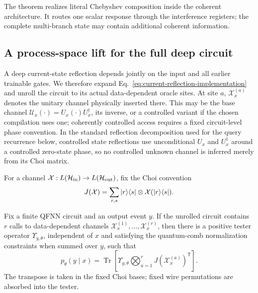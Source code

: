 \documentclass[pdflatex,sn-mathphys,NameDate,iicol]{sn-jnl}
\newcommand{\Tr}{\operatorname{Tr}}
\newcommand{\opketbra}[2]{\ket{#1}\!\bra{#2}}
\newcommand{\cU}{\mathcal{U}}
\newcommand{\cH}{\mathcal{H}}
\newcommand{\cX}{\mathcal{X}}
\begin{document}
The theorem realizes literal Chebyshev composition inside the coherent
architecture. It routes one scalar response through the interference
registers; the complete multi-branch state may contain additional coherent
information.

\subsection{A process-space lift for the full deep circuit}
\label{sec:process}

A deep current-state reflection depends jointly on the input and all earlier
trainable gates. We therefore expand
Eq.~\eqref{eq:current-reflection-implementation} and unroll the circuit to
its actual data-dependent oracle sites. At site $a$,
$\cX_x^{(a)}$ denotes the unitary channel physically inserted there. This
may be the base channel $\cU_x(\cdot)=U_x(\cdot)U_x^\dagger$, its inverse,
or a controlled variant if the chosen compilation uses one; coherently
controlled access requires a fixed circuit-level phase convention. In the
standard reflection decomposition used for the query recurrence below,
controlled state reflections use unconditional $U_x$ and $U_x^\dagger$
around a controlled zero-state phase, so no controlled unknown channel is
inferred merely from its Choi matrix.

For a channel $\cX:L(\cH_{\rm in})\to L(\cH_{\rm out})$, fix the Choi
convention
\begin{equation}
 J(\cX)=\sum_{r,s}\opketbra{r}{s}\otimes
                 \cX(\opketbra{r}{s}).
 \label{eq:choi-convention}
\end{equation}

\begin{theorem}
\label{thm:process-tester}
Fix a finite QFNN circuit and an output event $y$. If the unrolled circuit
contains $r$ calls to data-dependent channels
$\cX_x^{(1)},\ldots,\cX_x^{(r)}$, then there is a positive tester operator
$\Upsilon_{y,\theta}$, independent of $x$ and satisfying the quantum-comb
normalization constraints when summed over $y$, such that
\begin{equation}
 p_\theta(y\mid x)
 =\Tr\!\left[
   \Upsilon_{y,\theta}
   \bigotimes_{a=1}^{r}J(\cX_x^{(a)})^{\mathsf T}
  \right].
 \label{eq:tester-representation}
\end{equation}
The transpose is taken in the fixed Choi bases; fixed wire permutations are
absorbed into the tester.
\end{theorem}
\end{document}
